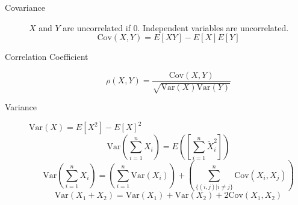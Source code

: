 \documentclass[8pt]{article}
\begin{document}

\begin{multicols}{2}
  \begin{description}
  \item[Covariance] $X$ and $Y$ are uncorrelated if 0. Independent
    variables are uncorrelated.
    $$\text{Cov}(X,Y)=E[XY]-E[X]E[Y]$$
  \item[Correlation Coefficient]
    $$\rho(X,Y)=\frac{\text{Cov}(X,Y)}{\sqrt{\text{Var}(X)\text{Var}(Y)}}$$
  \item[Variance] $\text{Var}(X) = E[X^2] - E[X]^2$
    $$\text{Var}\left(\sum_{i=1}^{n}X_i\right) =
    E\left(\left[\sum_{i=1}^{n}\tilde{X}_i^2\right]\right)$$
    $$\text{Var}\left(\sum_{i=1}^{n}X_i\right) =
    \left(\sum_{i=1}^{n}\text{Var}(X_i)\right) + \left(\sum_{\{(i,j) |
        i\not= j\}}^{n}\text{Cov}(X_i, X_j)\right)$$
    $$\text{Var}(X_1 + X_2) = \text{Var}(X_1) + \text{Var}(X_2) +
    2\text{Cov}(X_1,X_2)$$ 
  \end{description}
\end{multicols}
\end{document}

